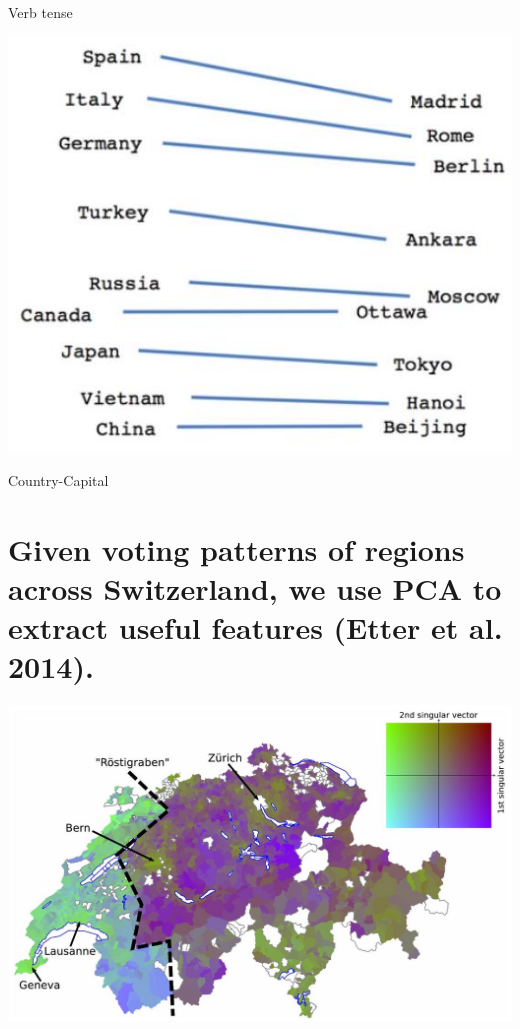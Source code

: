 \documentclass[10pt]{article}
\begin{document}
Verb tense

\begin{center}
\includegraphics[max width=\textwidth]{2024_01_08_e090cb7d953bac87fc33g-03}
\end{center}

Country-Capital

\section*{Given voting patterns of regions across Switzerland, we use PCA to extract useful features (Etter et al. 2014).}
\begin{center}
\includegraphics[max width=\textwidth]{2024_01_08_e090cb7d953bac87fc33g-04}
\end{center}
\end{document}
